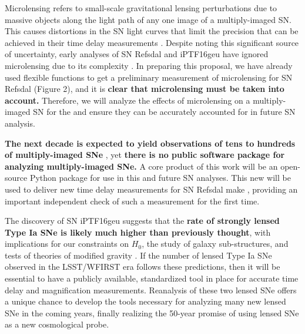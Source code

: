 Microlensing refers to small-scale gravitational lensing perturbations
due to massive objects along the light path of any one image of a
multiply-imaged SN. This causes distortions in the SN light curves
that limit the precision that can be achieved in
their time delay measurements \citep{Dobler:2006}. Despite noting this significant
source of uncertainty, early analyses of SN Refsdal and iPTF16geu have
ignored microlensing due to its
complexity \citep{More:2016,Rodney:2016}. In preparing this proposal,
we have already used flexible functions to get a preliminary
measurement of microlensing for SN Refsdal (Figure 2), and it is
\textbf{clear that microlensing must be taken into account.} 
Therefore, we will analyze the effects of microlensing on a
multiply-imaged SN for the and ensure they can be accurately accounted
for in future SN analysis.

\textbf{The next decade is expected to yield observations
of tens to hundreds of multiply-imaged SNe} \citep{Oguri:2010},
yet \textbf{there is no public software package for analyzing
multiply-imaged SNe.}  A core product of this work will be an
open-source Python package for use in this and future SN
analyses. This new will be used to deliver new time delay measurements 
for SN Refsdal make , providing an important
independent check of such a measurement for the first time.

The discovery of SN iPTF16geu suggests that the \textbf{rate of
strongly lensed Type Ia SNe is likely much higher than previously
thought}, with implications for our constraints on $H_0$, the study of
galaxy sub-structures, and tests of theories of modified gravity
\citep{Goobar:2016,More:2016}. If the number of lensed Type
Ia SNe observed in the LSST/WFIRST era follows these predictions, then
it will be essential to have a publicly available, standardized tool
in place for accurate time delay and magnification
measurements. Reanalysis of these two lensed SNe offers a unique
chance to develop the tools necessary for analyzing many new lensed
SNe in the coming years, finally realizing the 50-year promise of
using lensed SNe as a new cosmological probe.

